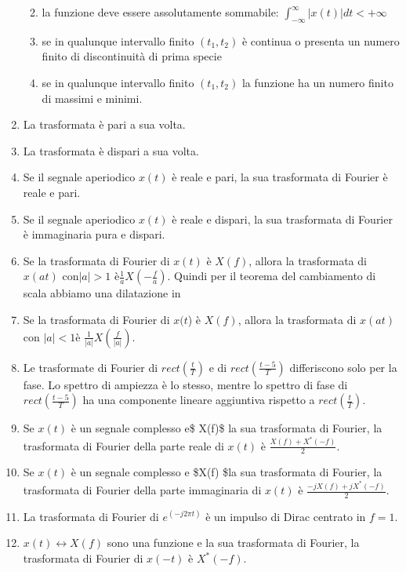 \documentclass[
]{article}
\providecommand{\tightlist}{%
  \setlength{\itemsep}{0pt}\setlength{\parskip}{0pt}}
\begin{document}
\begin{enumerate}
	\begin{enumerate}
		\def\labelenumii{(\alph{enumii})}
		\tightlist
		\item
		la funzione deve essere assolutamente sommabile: $\displaystyle \int_{-\infty}^{\infty} |x(t)| dt < +\infty$
		\item
		se in qualunque intervallo finito $(t_1, t_2)$ è continua o presenta un numero finito di discontinuità di prima specie
		\item
		 se in qualunque intervallo finito $(t_1, t_2)$ la funzione ha	 un numero finito di massimi e minimi.
	\end{enumerate}
	\item
	La trasformata è pari a sua volta.
	\item
	La trasformata è dispari a sua volta.
	\item
	Se il segnale aperiodico \(x(t)\) è reale e pari, la sua trasformata
	di Fourier è reale e pari.
	\item
	Se il segnale aperiodico \(x(t)\) è reale e dispari, la sua
	trasformata di Fourier è immaginaria pura e dispari.
	\item
Se la trasformata di Fourier di $x(t)$ è $X(f)$, allora la trasformata di $x(at)$ con$ |a| > 1$ è$ \frac{1}{a} X(-\frac{f}{a})$. Quindi per il teorema del cambiamento di scala abbiamo una dilatazione in
	\item
Se la trasformata di Fourier di $x(t$) è $X(f)$, allora la trasformata di $x(at)$ con $|a| < 1 $è $\frac{1}{|a|} X(\frac{f}{|a|})$.
	\item
	Le trasformate di Fourier di \(rect (\frac{t}{T})\) e di
	\(rect (\frac{t-5}{T})\) differiscono solo per la fase. Lo spettro di
	ampiezza è lo stesso, mentre lo spettro di fase di
	\(rect (\frac{t-5}{T})\) ha una componente lineare aggiuntiva rispetto
	a \(rect (\frac{t}{T})\).
	\item
	Se \(x(t)\) è un segnale complesso e\$ X(f)\$ la sua trasformata di
	Fourier, la trasformata di Fourier della parte reale di \(x(t)\) è
	\(\frac{X(f) + X^*(-f)}{2}\).
	\item
	Se \(x(t)\) è un segnale complesso e \$X(f) \$la sua trasformata di
	Fourier, la trasformata di Fourier della parte immaginaria di \(x(t)\)
	è \(\frac{-jX(f) + jX^*(-f)}{2}\).
	\item
	La trasformata di Fourier di \(e^{(-j2\pi t)}\) è un impulso di Dirac
	centrato in \(f = 1\).
	\item
	\(x(t) \leftrightarrow X(f)\) sono una funzione e la sua trasformata
	di Fourier, la trasformata di Fourier di \(x(-t)\) è \(X^*(-f)\).

\end{enumerate}
\end{document}
